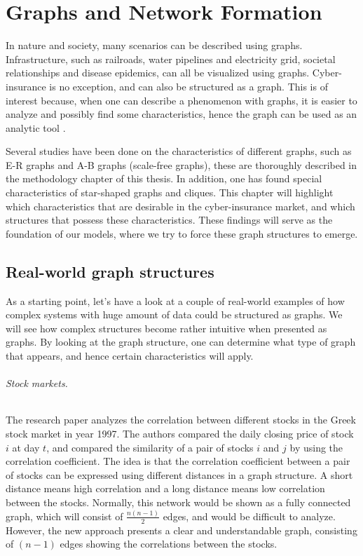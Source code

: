 \chapter{Graphs and Network Formation}
\label{chp:graphTheory} 

In nature and society, many scenarios can be described using graphs. Infrastructure, such as railroads, water pipelines and electricity grid, societal relationships and disease epidemics, can all be visualized using graphs. Cyber-insurance is no exception, and can also be structured as a graph. This is of interest because, when one can describe a phenomenon with graphs, it is easier to analyze and possibly find some characteristics, hence the graph can be used as an analytic tool \cite{audestad}. 

Several studies have been done on the characteristics of different graphs, such as E-R graphs and A-B graphs (scale-free graphs), these are thoroughly described in the methodology chapter of this thesis. In addition, one has found special characteristics of star-shaped graphs and cliques. This chapter will highlight which characteristics that are desirable in the cyber-insurance market, and which structures that possess these characteristics. These findings will serve as the foundation of our models, where we try to force these graph structures to emerge.
 
\section{Real-world graph structures}
As a starting point, let's have a look at a couple of real-world examples of how complex systems with huge amount of data could be structured as graphs. We will see how complex structures become rather intuitive when presented as graphs. By looking at the graph structure, one can determine what type of graph that appears, and hence certain characteristics will apply.  

\subparagraph{Stock markets.} The research paper \cite{greekStockMarket} analyzes the correlation between different stocks in the Greek stock market in year 1997. The authors compared the daily closing price of stock $i$ at day $t$, and compared the similarity of a pair of stocks $i$ and $j$ by using the correlation coefficient. The idea is that the correlation coefficient between a pair of stocks can be expressed using different distances in a graph structure. A short distance means high correlation and a long distance means low correlation between the stocks. Normally, this network would be shown as a fully connected graph, which will consist of $\frac{n(n-1)}{2}$ edges, and would be difficult to analyze. However, the new approach presents a clear and understandable graph, consisting of $(n-1)$ edges showing the correlations between the stocks.

